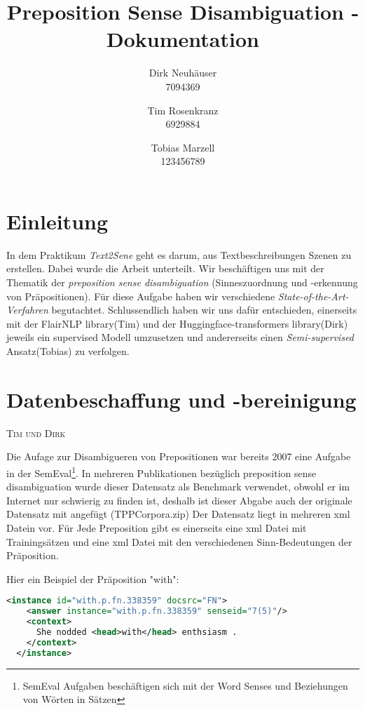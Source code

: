 \documentclass[10pt,a4paper]{article}
\newcommand{\chapterauthor}[1]{%
	{\parindent0pt\vspace*{-5pt}\hspace*{\fill}%
  \linespread{1.1}\large\scshape#1%
  \par\nobreak\vspace*{10pt}}
}
\begin{document}
\title{Preposition Sense Disambiguation - Dokumentation}
 
\author{
Dirk Neuhäuser \\ 7094369
\and
Tim Rosenkranz \\ 6929884
\and 
Tobias Marzell \\ 123456789
}

\maketitle
\tableofcontents

\section{Einleitung}
In dem Praktikum \textit{Text2Sene} geht es darum, aus Textbeschreibungen Szenen zu erstellen. Dabei wurde die Arbeit unterteilt. Wir beschäftigen uns mit der Thematik der \textit{preposition sense disambiguation} (Sinneszuordnung und -erkennung von Präpositionen). Für diese Aufgabe haben wir verschiedene \textit{State-of-the-Art-Verfahren} begutachtet. Schlussendlich haben wir uns dafür entschieden, einerseits mit der FlairNLP library(Tim) und der Huggingface-transformers library(Dirk) jeweils ein supervised Modell umzusetzen und andererseits einen \textit{Semi-supervised} Ansatz(Tobias) zu verfolgen.

\section{Datenbeschaffung und -bereinigung}
\chapterauthor{Tim und Dirk}
Die Aufage zur Disambigueren von Prepositionen war bereits 2007 eine Aufgabe in der SemEval\footnote{SemEval Aufgaben beschäftigen sich mit der Word Senses und Beziehungen von Wörten in Sätzen}. In mehreren Publikationen bezüglich preposition sense disambiguation wurde dieser Datensatz als Benchmark verwendet, obwohl er im Internet nur schwierig zu finden ist, deshalb ist dieser Abgabe auch der originale Datensatz mit angefügt (TPPCorpora.zip)
Der Datensatz liegt in mehreren xml Datein vor. Für Jede Preposition gibt es einerseits eine xml Datei mit Trainingsätzen und eine xml Datei mit den verschiedenen Sinn-Bedeutungen der Präposition.

Hier ein Beispiel der Präposition "with": 

\begin{lstlisting}[language=xml]
  <instance id="with.p.fn.338359" docsrc="FN">
    <answer instance="with.p.fn.338359" senseid="7(5)"/>
    <context>
      She nodded <head>with</head> enthsiasm .
    </context>
  </instance>
\end{lstlisting}
\end{document}
